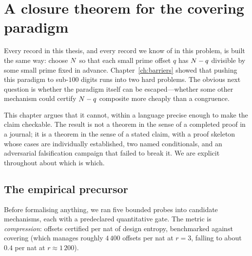 \chapter{A closure theorem for the covering paradigm}\label{ch:closure}

Every record in this thesis, and every record we know of in this problem, is
built the same way: choose $N$ so that each small prime offset $q$ has
$N-q$ divisible by some small prime fixed in advance. Chapter~\ref{ch:barriers}
showed that pushing this paradigm to sub-$100$ digits runs into two hard
problems. The obvious next question is whether the paradigm itself can be
escaped---whether some other mechanism could certify $N-q$ composite more
cheaply than a congruence.

This chapter argues that it cannot, within a language precise enough to make the
claim checkable. The result is not a theorem in the sense of a completed proof
in a journal; it is a theorem in the sense of a stated claim, with a proof
skeleton whose cases are individually established, two named conditionals, and
an adversarial falsification campaign that failed to break it. We are explicit
throughout about which is which.

\section{The empirical precursor}\label{sec:wp7}

Before formalising anything, we ran five bounded probes into candidate
mechanisms, each with a predeclared quantitative gate. The metric is
\emph{compression}: offsets certified per nat of design entropy, benchmarked
against covering (which manages roughly $4\,400$ offsets per nat at $r=3$,
falling to about $0.4$ per nat at $r\approx1\,200$).

